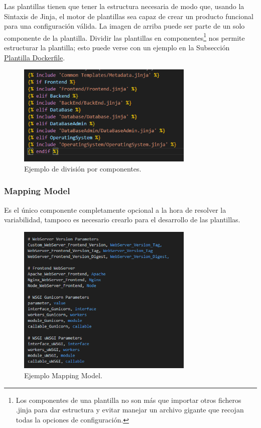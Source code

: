 \documentclass[12pt, a4paper, twoside]{article}
\begin{document}
Las plantillas tienen que tener la estructura necesaria de modo que, usando la Sintaxis de Jinja, el motor de plantillas sea capaz de crear un producto funcional para una configuración válida. La imagen de arriba puede ser parte de un solo componente de la plantilla.
Dividir las plantillas en componentes\footnote{Los componentes de una plantilla no son más que importar otros ficheros .jinja para dar estructura y evitar manejar un archivo gigante que recojan todas la opciones de configuración.} nos permite estructurar la plantilla; esto puede verse con un ejemplo en la Subsección \hyperref[sec:Plantilla Dockerfile]{Plantilla Dockerfile}.

\begin{figure}[h]
	\centering
		\includegraphics[width=0.75\textwidth]{Dockerfile.logica.plantillas.jinja.png}
	\caption{Ejemplo de división por componentes.}
\end{figure}


\newpage
\subsubsection{Mapping Model}
\label{sec:Mapping Model}
Es el único componente completamente opcional a la hora de resolver la variabilidad, tampoco es necesario crearlo para el desarrollo de las plantillas.

\begin{figure}[h]
	\centering
		\includegraphics[width=0.75\textwidth]{mapping_model_screenshot.png}
	\caption{Ejemplo Mapping Model.}
\end{figure}
\end{document}
